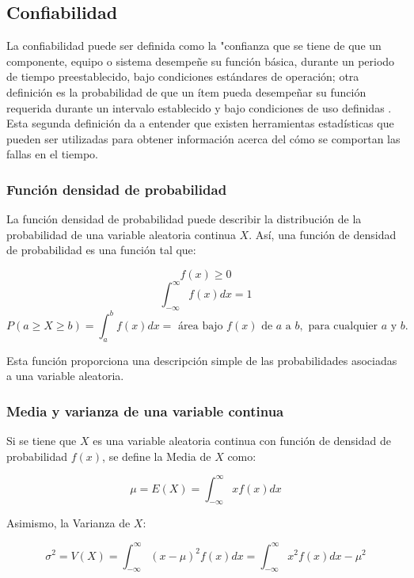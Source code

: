 \subsection{Confiabilidad}

La confiabilidad puede ser definida como la "confianza que se tiene de que un componente, equipo o sistema desempeñe su función básica, durante un periodo de tiempo preestablecido, bajo condiciones estándares de operación; otra definición es la probabilidad de que un ítem pueda desempeñar su función requerida durante un intervalo establecido y bajo condiciones de uso definidas \citep{dairo2016}. Esta segunda definición da a entender que existen herramientas estadísticas que pueden ser utilizadas para obtener información acerca del cómo se comportan las fallas en el tiempo.

\subsubsection{Función densidad de probabilidad}

La función densidad de probabilidad puede describir la distribución de la probabilidad de una variable aleatoria continua $X$. Así, una función de densidad de probabilidad es una función tal que:


 $$f(x)\geqslant 0$$
 $$\int_{-\infty}^{\infty}f(x)dx=1$$
 \begin{equation*}
 P(a\geqslant X \geqslant b)=\int_{a}^{b}f(x)dx= \text{ área bajo } f(x) \text{ de } a \text{ a } b, \text{ para cualquier } a \text{ y } b.
 \end{equation*}



Esta función proporciona una descripción simple de las probabilidades asociadas a una variable aleatoria.
\subsubsection{Media y varianza de una variable continua}

Si se tiene que $X$ es una variable aleatoria continua con función de densidad de probabilidad $f(x)$, se define la Media de $X$ como:

\begin{equation*}
\mu=E(X)=\int_{-\infty}^{\infty}xf(x)dx
\end{equation*}

Asimismo, la Varianza de $X$:

\begin{equation*}
\sigma^2=V(X)=\int_{-\infty}^{\infty}(x-\mu)^{2}f(x)dx=\int_{-\infty}^{\infty}x^{2}f(x)dx-\mu^2
\end{equation*}

